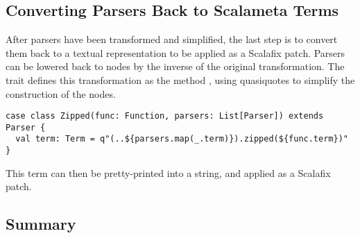 \documentclass[../../../main.tex]{subfiles}
\begin{document}
\subsection{Converting Parsers Back to Scalameta Terms}
After parsers have been transformed and simplified, the last step is to convert them back to a textual representation to be applied as a Scalafix patch.
Parsers can be lowered back to  nodes by the inverse of the original  transformation.
The  trait defines this transformation as the method , using quasiquotes to simplify the construction of the  nodes.
\begin{verbatim}
case class Zipped(func: Function, parsers: List[Parser]) extends Parser {
  val term: Term = q"(..${parsers.map(_.term)}).zipped(${func.term})"
}
\end{verbatim}
%
This term can then be pretty-printed into a string, and applied as a Scalafix patch.

\subsection*{Summary}
\end{document}
